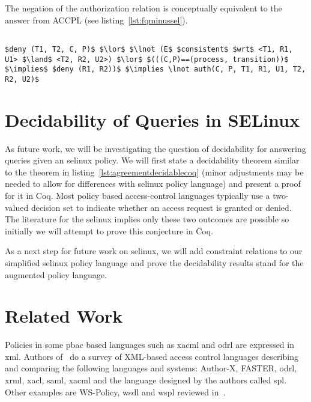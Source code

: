 The negation of the authorization relation  is conceptually equivalent to the  answer from \ac{ACCPL} (see listing~\ref{lst:fqminussel}).

\lstset{mathescape, language=AST} 
\begin{lstlisting}[frame=single, caption={\syn{NotPermitted} for \ac{selinux}},label={lst:fqminussel}]

$deny (T1, T2, C, P)$ $\lor$ $\lnot (E$ $consistent$ $wrt$ <T1, R1, U1> $\land$ <T2, R2, U2>) $\lor$ $(((C,P)==(process, transition))$ $\implies$ $deny (R1, R2))$ $\implies \lnot auth(C, P, T1, R1, U1, T2, R2, U2)$ 

\end{lstlisting}

\section{Decidability of Queries in SELinux}

As future work, we will be investigating the question of decidability for answering queries given an \ac{selinux} policy. We will first state a decidability theorem similar to the theorem in listing~\ref{lst:agreementdecidablecoq} (minor adjustments may be needed to allow for differences with \ac{selinux} policy language) and present a proof for it in Coq. Most policy based access-control languages typically use a two-valued decision set to indicate whether an access request is granted or denied. The literature for the \ac{selinux} implies only these two outcomes are possible so initially we will attempt to prove this conjecture in Coq. 

As a next step for future work on \ac{selinux}, we will add constraint relations to our simplified \ac{selinux} policy language and prove the decidability results stand for the augmented policy language.

\section{Related Work}

Policies in some \ac{pbac} based languages such as \ac{xacml} and \ac{odrl} are expressed in \ac{xml}. Authors of~\cite{surveyXML} do a survey of XML-based access control languages describing and comparing the following languages and systems: Author-X, FASTER, \ac{odrl}, \ac{xrml}, \ac{xacl}, \ac{saml}, \ac{xacml} and the language designed by the authors called \ac{spl}. Other examples are WS-Policy, \ac{wsdl} and \ac{wspl} reviewed in~\cite{ArdagnaDVS04}.

